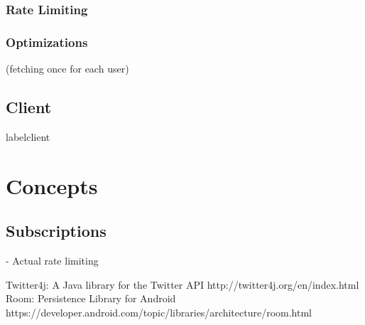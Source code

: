 \documentclass{article}
\begin{document}
\subsubsection{Rate Limiting}
\label{rate_limiting}
\subsubsection{Optimizations} (fetching once for each user)
\label{optimizations}
\subsection{Client}
label{client}
\section{Concepts}
\subsection{Subscriptions}
\label{subscriptions}
- Actual rate limiting

\newpage

\begin{thebibliography}{9}
  Twitter4j: A Java library for the Twitter API http://twitter4j.org/en/index.html
  Room: Persistence Library for Android https://developer.android.com/topic/libraries/architecture/room.html

\end{thebibliography}
\end{document}
